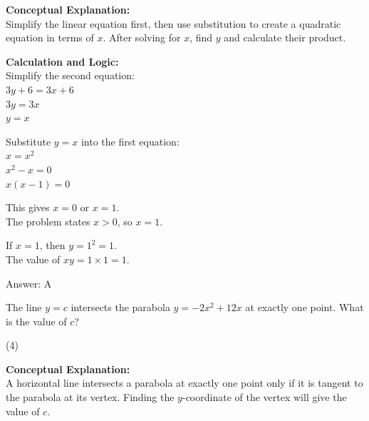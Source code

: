 \documentclass[11pt,paper=a4,answers]{exam}
\begin{document}
\begin{questions}
\begin{solution}
\textbf{Conceptual Explanation:} \\
Simplify the linear equation first, then use substitution to create a quadratic equation in terms of $x$. After solving for $x$, find $y$ and calculate their product.

\vspace{20pt}

\textbf{Calculation and Logic:} \\
Simplify the second equation: \\
$3y + 6 = 3x + 6$ \\
$3y = 3x$ \\
$y = x$

\vspace{10pt}

Substitute $y = x$ into the first equation: \\
$x = x^2$ \\
$x^2 - x = 0$ \\
$x(x - 1) = 0$

\vspace{10pt}

This gives $x = 0$ or $x = 1$. \\
The problem states $x > 0$, so $x = 1$.

\vspace{10pt}

If $x = 1$, then $y = 1^2 = 1$. \\
The value of $xy = 1 \times 1 = 1$.

\vspace{25pt}

Answer: \colorbox{yellow!100}{A}
\end{solution}

\vspace{40pt}

\question
The line $y = c$ intersects the parabola $y = -2x^2 + 12x$ at exactly one point. What is the value of $c$?
\begin{tasks}(4)
\end{tasks}

\begin{solution}
\textbf{Conceptual Explanation:} \\
A horizontal line intersects a parabola at exactly one point only if it is tangent to the parabola at its vertex. Finding the $y$-coordinate of the vertex will give the value of $c$.


\end{solution}
\end{questions}
\end{document}
